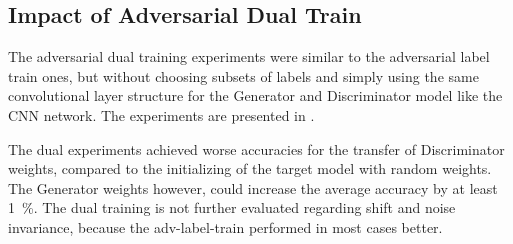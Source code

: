 \subsection{Impact of Adversarial Dual Train}
The adversarial dual training experiments were similar to the adversarial label train ones, but without choosing subsets of labels and simply using the same convolutional layer structure for the Generator and Discriminator model like the CNN network.
The experiments are presented in .

The dual experiments achieved worse accuracies for the transfer of Discriminator weights, compared to the initializing of the target model with random weights.
The Generator weights however, could increase the average accuracy by at least \SI{1}{\percent}.
The dual training is not further evaluated regarding shift and noise invariance, because the adv-label-train performed in most cases better.




